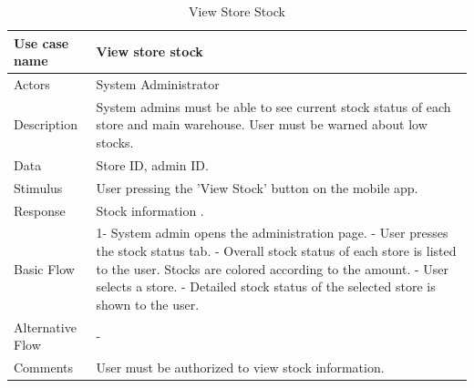 \documentclass[11pt]{article}
\begin{document}
        \begin{table}[H]
        \begin{centering}
        \begin{tabular}{|p{2.5cm}|p{12cm}|}
        \hline
        Use case name & View store stock  \\ \hline
        Actors        & System Administrator \\ \hline
        Description   & System admins must be able to see current stock status of each store and main warehouse. User must be warned about low stocks.\\ \hline
        Data          & Store ID, admin ID. \\ \hline
        Stimulus      & User pressing the 'View Stock' button on the mobile app. \\ \hline
        Response      & Stock information .\\ \hline
        Basic Flow    &
        1- System admin opens the administration page. \newline
        2- User presses the stock status tab. \newline
        3- Overall stock status of each store is listed to the user. Stocks are colored according to the amount. \newline
        4- User selects a store. \newline
        5- Detailed stock status of the selected store is shown to the user.
        \\ \hline
        Alternative
            Flow      & - \\ \hline
        Comments      & User must be authorized to view stock information. \\ \hline
        \end{tabular}
        \caption{ View Store Stock }
        \label{tab_10}
        \end{centering}
        \end{table}    
        
        
                
\end{document}
